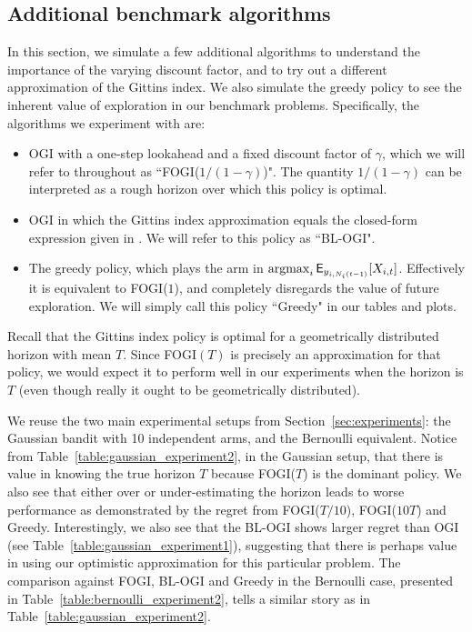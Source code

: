{\color{blue}
\subsection{Additional benchmark algorithms}
In this section, we simulate a few additional algorithms to understand the importance of the varying discount factor, and to try out a different approximation of the Gittins index.
We also simulate the greedy policy to see the inherent value of exploration in our benchmark problems.
Specifically, the algorithms we experiment with are:
\begin{itemize}
	\item OGI with a one-step lookahead and a fixed discount factor of $\gamma$, which we will refer to throughout as ``FOGI($1/(1-\gamma)$)". The quantity $1/(1-\gamma)$ can be interpreted as a rough horizon over which this policy is optimal.
	\item OGI in which the Gittins index approximation equals the closed-form expression given in \cite{brezzi2002optimal}. We will refer to this policy as ``BL-OGI".
	\item The greedy policy, which plays the arm in $\operatorname*{\mathrm{argmax}}_i \mathsf{E}_{y_{i, N_i(t-1)}}[X_{i,t}]$. Effectively it is equivalent to FOGI($1$), and completely disregards the value of future exploration. We will simply call this policy ``Greedy" in our tables and plots.
\end{itemize}
Recall that the Gittins index policy is optimal for a geometrically distributed horizon with mean $T$. Since FOGI$(T)$ is precisely an approximation for that policy, we would expect it to perform well in our experiments when the horizon is $T$ (even though really it ought to be geometrically distributed).

We reuse the two main experimental setups from Section~\ref{sec:experiments}: the Gaussian bandit with 10 independent arms, and the Bernoulli equivalent. Notice from Table~\ref{table:gaussian_experiment2}, in the Gaussian setup, that there is value in knowing the true horizon $T$ because FOGI($T$) is the dominant policy. 
We also see that either over or under-estimating the horizon leads to worse performance as demonstrated by the regret from FOGI($T/10$), FOGI($10T$) and Greedy. Interestingly, we also see that the BL-OGI shows larger regret than OGI (see Table~\ref{table:gaussian_experiment1}), suggesting that there is perhaps value in using our optimistic approximation for this particular problem. The comparison against FOGI, BL-OGI and Greedy in the Bernoulli case, presented in Table~\ref{table:bernoulli_experiment2}, tells a similar story as in Table~\ref{table:gaussian_experiment2}.

}
